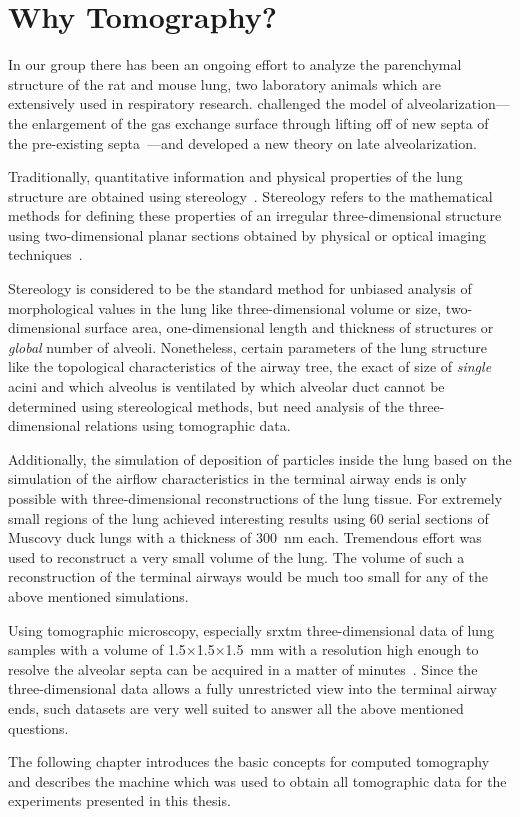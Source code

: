 \section{Why Tomography?}
In our group there has been an ongoing effort to analyze the parenchymal structure of the rat and mouse lung, two laboratory animals which are extensively used in respiratory research. \citet{Mund2008} challenged the model of alveolarization---the enlargement of the gas exchange surface through lifting off of new septa of the pre-existing septa~\cite{Burri1974,Massaro1985}---and developed a new theory on late alveolarization.

Traditionally, quantitative information and physical properties of the lung structure are obtained using stereology~\cite{Ochs2006}. Stereology refers to the mathematical methods for defining these properties of an irregular three-dimensional structure using two-dimensional planar sections obtained by physical or optical imaging techniques~\cite{Hsia2010}.

Stereology is considered to be the standard method for unbiased analysis of morphological values in the lung like three-dimensional volume or size, two-dimensional surface area, one-dimensional length and thickness of structures or \textit{global} number of alveoli. Nonetheless, certain parameters of the lung structure like the topological characteristics of the airway tree, the exact of size of \textit{single} acini and which alveolus is ventilated by which alveolar duct cannot be determined using stereological methods, but need analysis of the three-dimensional relations using tomographic data.

Additionally, the simulation of deposition of particles inside the lung based on the simulation of the airflow characteristics in the terminal airway ends is only possible with three-dimensional reconstructions of the lung tissue. For extremely small regions of the lung \citet{Woodward2005} achieved interesting results using 60 serial sections of Muscovy duck lungs with a thickness of \SI{300}{\nano\meter} each. Tremendous effort was used to reconstruct a very small volume of the lung. The volume of such a reconstruction of the terminal airways would be much too small for any of the above mentioned simulations.

Using tomographic microscopy, especially \ac{srxtm} three-dimensional data of lung samples with a volume of 1.5$\times$1.5$\times$\SI{1.5}{\milli\meter} with a resolution high enough to resolve the alveolar septa can be acquired in a matter of minutes~\cite{Hintermueller2010}. Since the three-dimensional data allows a fully unrestricted view into the terminal airway ends, such datasets are very well suited to answer all the above mentioned questions.

The following chapter introduces the basic concepts for computed tomography and describes the machine which was used to obtain all tomographic data for the experiments presented in this thesis.